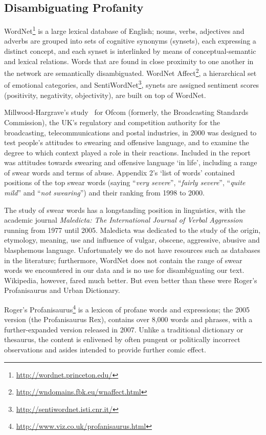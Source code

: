 \documentclass{AISB2008}
\begin{document}
\subsection{Disambiguating Profanity}

WordNet\footnote{\url{http://wordnet.princeton.edu/}} is a large
lexical database of English; nouns, verbs, adjectives and adverbs are
grouped into sets of cognitive synonyms (synsets), each expressing a
distinct concept, and each synset is interlinked by means of
conceptual-semantic and lexical relations. Words that are found in
close proximity to one another in the network are semantically
disambiguated. WordNet
Affect\footnote{\url{http://wndomains.fbk.eu/wnaffect.html}}, a
hierarchical set of emotional categories, and
SentiWordNet\footnote{\url{http://sentiwordnet.isti.cnr.it/}}, synets
are assigned sentiment scores (positivity, negativity, objectivity),
are built on top of WordNet.

Millwood-Hargrave's study~\cite{millwood-hargrave:2000} for Ofcom
(formerly, the Broadcasting Standards Commission), the UK's regulatory
and competition authority for the broadcasting, telecommunications and
postal industries, in 2000 was designed to test people’s attitudes to
swearing and offensive language, and to examine the degree to which
context played a role in their reactions. Included in the report was
attitudes towards swearing and offensive language `in life', including
a range of swear words and terms of abuse. Appendix 2’s `list of
words' contained positions of the top swear words (saying
``{\emph{very severe}}'', ``{\emph{fairly severe}}'', ``{\emph{quite
mild}}'' and ``{\emph{not swearing}}'') and their ranking from 1998 to
2000.

The study of swear words has a longstanding position in linguistics,
with the academic journal {\emph{Maledicta: The International Journal
of Verbal Aggression}} running from 1977 until 2005. Maledicta was
dedicated to the study of the origin, etymology, meaning, use and
influence of vulgar, obscene, aggressive, abusive and blasphemous
language. Unfortunately we do not have resources such as databases in
the literature; furthermore, WordNet does not contain the range of
swear words we encountered in our data and is no use for
disambiguating our text. Wikipedia, however, fared much better. But
even better than these were Roger's Profanisaurus and Urban
Dictionary.

Roger's
Profanisaurus\footnote{\url{http://www.viz.co.uk/profanisaurus.html}}
is a lexicon of profane words and expressions; the 2005 version (the
Profanisaurus Rex), contains over 8,000 words and phrases, with a
further-expanded version released in 2007. Unlike a traditional
dictionary or thesaurus, the content is enlivened by often pungent or
politically incorrect observations and asides intended to provide
further comic effect.
\end{document}
